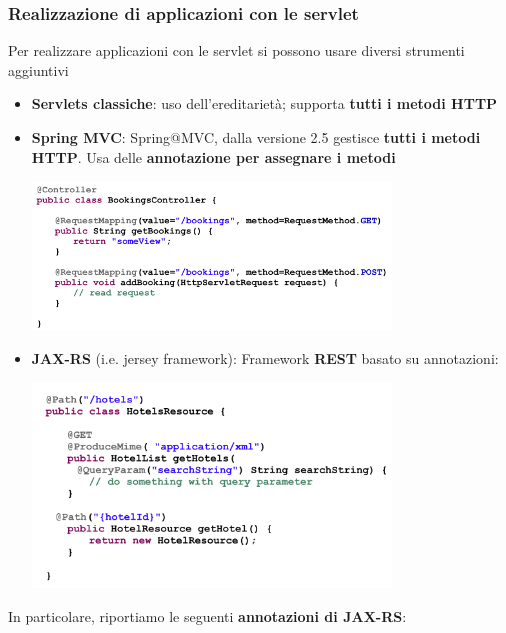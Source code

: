 \documentclass[12pt]{article}
\begin{document}
\subsubsection{Realizzazione di applicazioni con le servlet}
Per realizzare applicazioni con le servlet si possono usare diversi strumenti aggiuntivi
\begin{itemize}
    \item \textbf{Servlets classiche}: uso dell'ereditarietà; supporta \textbf{tutti i metodi HTTP}
    \item \textbf{Spring MVC}: Spring@MVC, dalla versione 2.5 gestisce \textbf{tutti i metodi HTTP}. Usa delle \textbf{annotazione per assegnare i metodi}
    \begin{center}
        \includegraphics[width = 0.75\textwidth]{Images/188.png}
    \end{center}
    \item \textbf{JAX-RS} (i.e. jersey framework): Framework \textbf{REST} basato su annotazioni:
    \begin{center}
        \includegraphics[width = 0.75\textwidth]{Images/189.png}
    \end{center}
\end{itemize}
In particolare, riportiamo le seguenti \textbf{annotazioni di JAX-RS}:
\end{document}
